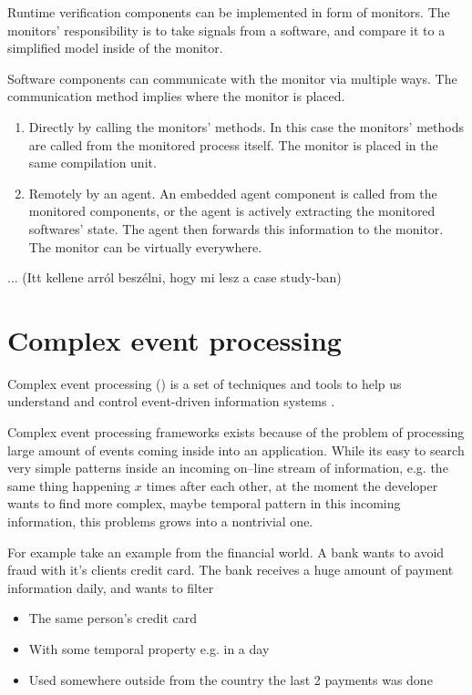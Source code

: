Runtime verification components can be implemented in form of monitors. The monitors' responsibility is to take signals from a software, and compare it to a simplified model inside of the monitor.

Software components can communicate with the monitor via multiple ways. The communication method implies where the monitor is placed.
\begin{enumerate}
	\item Directly by calling the monitors' methods. In this case the monitors' methods are called from the monitored process itself. The monitor is placed in the same compilation unit.
	      \item\label{item:agent} Remotely by an agent. An embedded agent component is called from the monitored components, or the agent is actively extracting the monitored softwares' state. The agent then forwards this information to the monitor. The monitor can be virtually everywhere.
\end{enumerate}

... (Itt kellene arról beszélni, hogy mi lesz a case study-ban)

\section{Complex event processing}

Complex event processing (\cep) is a set of techniques and tools to help us understand and control event-driven information systems \citep{Luckham:2001:PEI:515781}.

Complex event processing frameworks exists because of the problem of processing large amount of events coming inside into an application. While its easy to search  very simple patterns inside an incoming on--line stream of information, e.g. the same thing happening $x$ times after each other, at the moment the developer wants to find more complex, maybe temporal pattern in this incoming information, this problems grows into a nontrivial one.

For example take an example from the financial world. A bank wants to avoid fraud with it's clients credit card. The bank receives a huge amount of payment information daily, and wants to filter
\begin{itemize}
	\item The same person's credit card
	\item With some temporal property e.g. in a day
	\item Used somewhere outside from the country the last 2 payments was done
\end{itemize}

